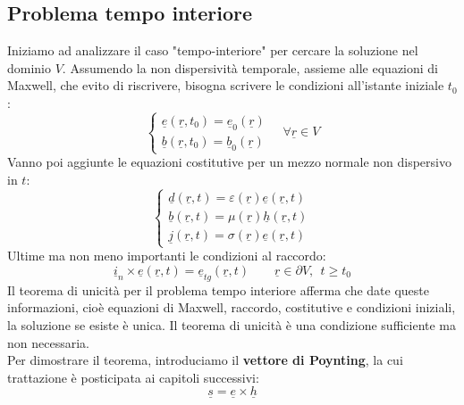 \documentclass{book}
\begin{document}
        \subsection{Problema tempo interiore}
        Iniziamo ad analizzare il caso "tempo-interiore" per cercare la soluzione nel dominio $V$. Assumendo la non dispersività temporale, assieme alle equazioni di Maxwell, che evito di riscrivere, bisogna scrivere le condizioni all'istante iniziale $t_{0}$:
        \begin{equation}
            \begin{cases}
                \underline{e}(\underline{r},t_{0}) = \underline{e}_{0}(\underline{r}) \\
                \underline{b}(\underline{r},t_{0}) = \underline{b}_{0}(\underline{r})
            \end{cases} \quad \forall \underline{r} \in V
        \end{equation}
        Vanno poi aggiunte le equazioni costitutive per un mezzo normale non dispersivo in $t$:
        \begin{equation}
        \begin{cases}
            \underline{d}(\underline{r},t) = \varepsilon(\underline{r}) \underline{e}(\underline{r},t) \\
            \underline{b}(\underline{r},t) = \mu (\underline{r}) \underline{h}(\underline{r},t) \\
            \underline{j}(\underline{r},t) = \sigma ( \underline{r}) \underline{e}(\underline{r},t)
        \end{cases}
        \end{equation}
        Ultime ma non meno importanti le condizioni al raccordo:
        \begin{equation}
            \underline{i}_{n} \times \underline{e}(\underline{r}, t) = \underline{e}_{tg}(\underline{r},t) \qquad \underline{r} \in \partial V, \ \ t \geq t_{0}
        \end{equation}
        Il teorema di unicità per il problema tempo interiore afferma che date queste informazioni, cioè equazioni di Maxwell, raccordo, costitutive e condizioni iniziali, la soluzione se esiste è unica. Il teorema di unicità è una condizione sufficiente ma non necessaria. \\
        Per dimostrare il teorema, introduciamo il \textbf{vettore di Poynting}, la cui trattazione è posticipata ai capitoli successivi:
        \begin{equation}
            \underline{s} = \underline{e} \times \underline{h}
        \end{equation}
\end{document}
